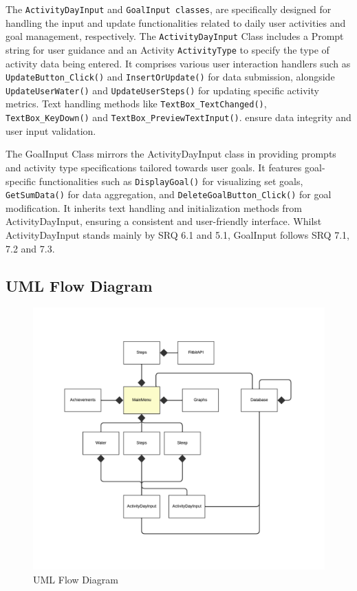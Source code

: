 \documentclass[12pt]{article}
\begin{document}
The \texttt{ActivityDayInput} and \texttt{GoalInput classes}, are specifically
designed for handling the input and update functionalities related to daily
user activities and goal management, respectively. The
\texttt{ActivityDayInput} Class includes a Prompt string for user guidance and
an Activity \texttt{ActivityType} to specify the type of activity data being
entered. It comprises various user interaction handlers such as
\texttt{UpdateButton\_Click()} and \texttt{InsertOrUpdate()} for data
submission, alongside \texttt{UpdateUserWater()} and \texttt{UpdateUserSteps()}
for updating specific activity metrics. Text handling methods like
\texttt{TextBox\_TextChanged()}, \texttt{TextBox\_KeyDown()} and
\texttt{TextBox\_PreviewTextInput()}. ensure data integrity and user input
validation.\par

The GoalInput Class mirrors the ActivityDayInput class in providing prompts and
activity type specifications tailored towards user goals. It features
goal-specific functionalities such as \texttt{DisplayGoal()} for visualizing set goals,
\texttt{GetSumData()} for data aggregation, and \texttt{DeleteGoalButton\_Click()} for
goal modification. It inherits text handling and initialization methods from
ActivityDayInput, ensuring a consistent and user-friendly interface. Whilst
ActivityDayInput stands mainly by SRQ 6.1 and 5.1, GoalInput follows SRQ 7.1, 7.2 and 7.3.\par

\subsection{UML Flow Diagram}

\begin{figure}[!ht]
  \centering
  \includegraphics[width = 0.7\linewidth]{UML Flow diagram}
  \caption{UML Flow Diagram}
  \label{fig:flow}
\end{figure}
\end{document}
